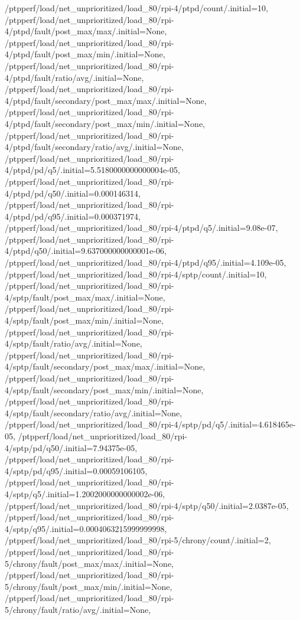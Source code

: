 {    /ptpperf/load/net_unprioritized/load_80/rpi-4/ptpd/count/.initial=10,
    /ptpperf/load/net_unprioritized/load_80/rpi-4/ptpd/fault/post_max/max/.initial=None,
    /ptpperf/load/net_unprioritized/load_80/rpi-4/ptpd/fault/post_max/min/.initial=None,
    /ptpperf/load/net_unprioritized/load_80/rpi-4/ptpd/fault/ratio/avg/.initial=None,
    /ptpperf/load/net_unprioritized/load_80/rpi-4/ptpd/fault/secondary/post_max/max/.initial=None,
    /ptpperf/load/net_unprioritized/load_80/rpi-4/ptpd/fault/secondary/post_max/min/.initial=None,
    /ptpperf/load/net_unprioritized/load_80/rpi-4/ptpd/fault/secondary/ratio/avg/.initial=None,
    /ptpperf/load/net_unprioritized/load_80/rpi-4/ptpd/pd/q5/.initial=5.5180000000000004e-05,
    /ptpperf/load/net_unprioritized/load_80/rpi-4/ptpd/pd/q50/.initial=0.000146314,
    /ptpperf/load/net_unprioritized/load_80/rpi-4/ptpd/pd/q95/.initial=0.000371974,
    /ptpperf/load/net_unprioritized/load_80/rpi-4/ptpd/q5/.initial=9.08e-07,
    /ptpperf/load/net_unprioritized/load_80/rpi-4/ptpd/q50/.initial=9.637000000000001e-06,
    /ptpperf/load/net_unprioritized/load_80/rpi-4/ptpd/q95/.initial=4.109e-05,
    /ptpperf/load/net_unprioritized/load_80/rpi-4/sptp/count/.initial=10,
    /ptpperf/load/net_unprioritized/load_80/rpi-4/sptp/fault/post_max/max/.initial=None,
    /ptpperf/load/net_unprioritized/load_80/rpi-4/sptp/fault/post_max/min/.initial=None,
    /ptpperf/load/net_unprioritized/load_80/rpi-4/sptp/fault/ratio/avg/.initial=None,
    /ptpperf/load/net_unprioritized/load_80/rpi-4/sptp/fault/secondary/post_max/max/.initial=None,
    /ptpperf/load/net_unprioritized/load_80/rpi-4/sptp/fault/secondary/post_max/min/.initial=None,
    /ptpperf/load/net_unprioritized/load_80/rpi-4/sptp/fault/secondary/ratio/avg/.initial=None,
    /ptpperf/load/net_unprioritized/load_80/rpi-4/sptp/pd/q5/.initial=4.618465e-05,
    /ptpperf/load/net_unprioritized/load_80/rpi-4/sptp/pd/q50/.initial=7.94375e-05,
    /ptpperf/load/net_unprioritized/load_80/rpi-4/sptp/pd/q95/.initial=0.00059106105,
    /ptpperf/load/net_unprioritized/load_80/rpi-4/sptp/q5/.initial=1.2002000000000002e-06,
    /ptpperf/load/net_unprioritized/load_80/rpi-4/sptp/q50/.initial=2.0387e-05,
    /ptpperf/load/net_unprioritized/load_80/rpi-4/sptp/q95/.initial=0.0004063215999999998,
    /ptpperf/load/net_unprioritized/load_80/rpi-5/chrony/count/.initial=2,
    /ptpperf/load/net_unprioritized/load_80/rpi-5/chrony/fault/post_max/max/.initial=None,
    /ptpperf/load/net_unprioritized/load_80/rpi-5/chrony/fault/post_max/min/.initial=None,
    /ptpperf/load/net_unprioritized/load_80/rpi-5/chrony/fault/ratio/avg/.initial=None,
}
